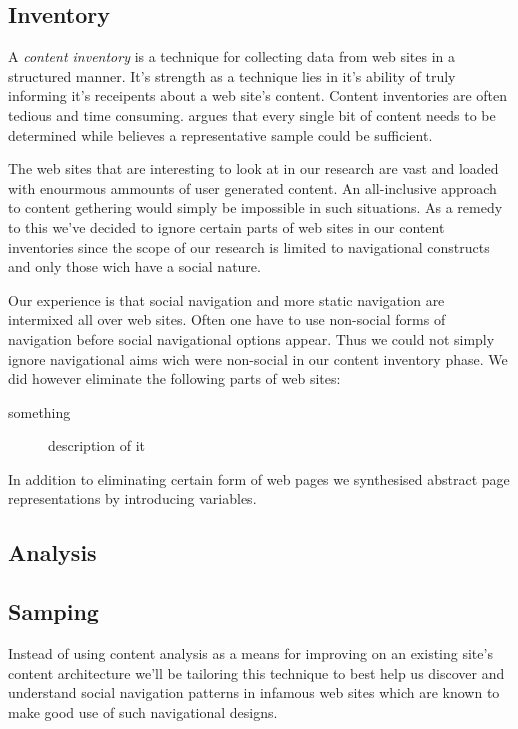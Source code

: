 
\subsection{Inventory}

A \emph{content inventory} is a technique for collecting data from web sites
in a structured manner. It's strength as a technique lies in it's ability of
truly informing it's receipents about a web site's content. Content
inventories are often tedious and time consuming. \citet[p.~267]{wodtke02}
argues that every single bit of content needs to be determined while
\citet{morville06} believes a representative sample could be sufficient.

The web sites that are interesting to look at in our research are vast and
loaded with enourmous ammounts of user generated content. An all-inclusive
approach to content gethering would simply be impossible in such situations.
As a remedy to this we've decided to ignore certain parts of web sites in our
content inventories since the scope of our research is limited to navigational
constructs and only those wich have a social nature.

Our experience is that social navigation and more static navigation are
intermixed all over web sites. Often one have to use non-social forms of
navigation before social navigational options appear. Thus we could not simply
ignore navigational aims wich were non-social in our content inventory phase.
We did however eliminate the following parts of web sites:

\begin{description}
  \item[something] description of it
\end{description}

In addition to eliminating certain form of web pages we synthesised abstract
page representations by introducing variables. %


\subsection{Analysis}

\subsection{Samping}


Instead of using content analysis as a means for improving on an existing
site's content architecture we'll be tailoring this technique to best help us
discover and understand social navigation patterns in infamous web sites which
are known to make good use of such navigational designs.

